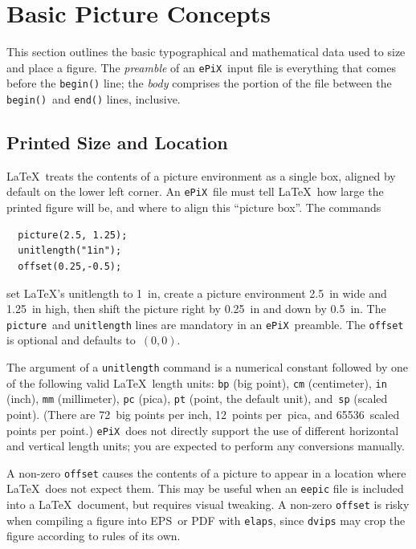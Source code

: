 \documentclass[12pt]{report}
\newcommand{\code}[1]{\texttt{#1}}
\newcommand{\ePiX}{\code{ePiX}}
\begin{document}
\section{Basic Picture Concepts}

This section outlines the basic typographical and mathematical data
used to size and place a figure. The \emph{preamble}
of an \ePiX\ input file is everything that comes before the
\code{begin()} line; the \emph{body} comprises the portion of the file
between the \code{begin()}~and \code{end()} lines, inclusive.


\subsection*{Printed Size and Location}

\LaTeX\ treats the contents of a picture environment as a single box,
aligned by default on the lower left corner. An \ePiX\ file must tell
\LaTeX\ how large the printed figure will be, and where to align this
``picture box''. The commands
\begin{verbatim}
  picture(2.5, 1.25);
  unitlength("1in");
  offset(0.25,-0.5);
\end{verbatim}
set \LaTeX's unitlength to 1~in, create a picture environment 2.5~in
wide and 1.25~in high, then shift the picture right by 0.25~in and
down by 0.5~in. The \code{picture}~and \code{unitlength} lines are
mandatory in an \ePiX\ preamble. The \code{offset} is optional and
defaults to~$(0,0)$.

The argument of a \code{unitlength} command is a
numerical constant followed by one of the following valid \LaTeX\
length units: \code{bp} (big point), \code{cm} (centimeter), \code{in}
(inch), \code{mm} (millimeter), \code{pc} (pica), \code{pt} (point,
the default unit), and~\code{sp} (scaled point).  (There are 72~big
points per inch, 12~points per~pica, and 65536~scaled points per
point.)  \ePiX\ does not directly support the use of different
horizontal and vertical length units; you are expected to perform any
conversions manually.

A non-zero \code{offset} causes the contents of a picture to appear in
a location where \LaTeX\ does not expect them. This may be useful when
an \code{eepic} file is included into a \LaTeX\ document, but requires
visual tweaking. A non-zero \code{offset} is risky when compiling a
figure into EPS~or PDF with \code{elaps}, since \code{dvips} may crop
the figure according to rules of its own.
\end{document}
